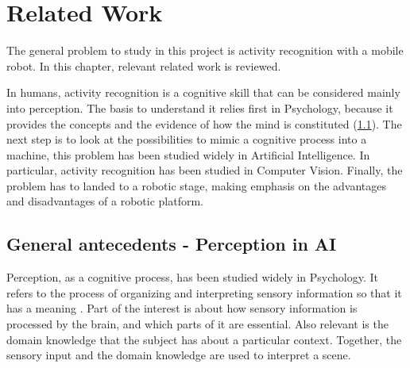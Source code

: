 \documentclass[a4paper, 12pt, openany, oneside]{book}
\begin{document}
\pagestyle{emty} %

\cleardoublepage

\newpage
{}
\tableofcontents

\newpage
\pagestyle{plain}


\chapter{Related Work}

The general problem to study in this project is activity recognition with a mobile robot. 
In this chapter, relevant related work is reviewed.

In humans, activity recognition is a cognitive skill that can be considered mainly into perception. 
The basis to understand it relies first in Psychology, because it provides the concepts and the evidence of how the mind is constituted (\ref{ch_LitRev_Perception}). 
The next step is to look at the possibilities to mimic a cognitive process into a machine, this problem has been studied widely in Artificial Intelligence. %
In particular, activity recognition has been studied in Computer Vision. %
Finally, the problem has to landed to a robotic stage, making emphasis on the advantages and disadvantages of a robotic platform. %


\section{General antecedents - Perception in AI} \label{ch_LitRev_Perception}

Perception, as a cognitive process, has been studied widely in Psychology.
It refers to the process of organizing and interpreting sensory information so that it has a meaning \citep{King2014Psychology}.
Part of the interest is about how sensory information is processed by the brain, and which parts of it are essential.
Also relevant is the domain knowledge that the subject has about a particular context.
Together, the sensory input and the domain knowledge are used to interpret a scene.
\end{document}
